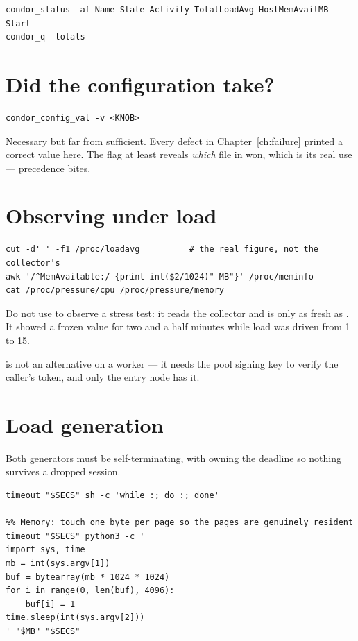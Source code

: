 \begin{lstlisting}[style=term]
condor_status -af Name State Activity TotalLoadAvg HostMemAvailMB Start
condor_q -totals
\end{lstlisting}

\section{Did the configuration take?}

\begin{lstlisting}[style=term]
condor_config_val -v <KNOB>
\end{lstlisting}

\begin{trap}
Necessary but far from sufficient. Every defect in Chapter~\ref{ch:failure}
printed a correct value here. The  flag at least reveals \emph{which} file
in  won, which is its real use --- precedence bites.
\end{trap}

\section{Observing under load}

\begin{lstlisting}[style=term]
cut -d' ' -f1 /proc/loadavg          # the real figure, not the collector's
awk '/^MemAvailable:/ {print int($2/1024)" MB"}' /proc/meminfo
cat /proc/pressure/cpu /proc/pressure/memory
\end{lstlisting}

\begin{trap}
Do not use  to observe a stress test: it reads the collector
and is only as fresh as . It showed a frozen value for two
and a half minutes while load was driven from 1 to 15.

 is not an alternative on a worker --- it needs the
pool signing key to verify the caller's token, and only the entry node has it.
\end{trap}

\section{Load generation}

Both generators must be self-terminating, with  owning the deadline
so nothing survives a dropped session.

\begin{lstlisting}[style=term]
%% CPU: tight loop, no fork per iteration
timeout "$SECS" sh -c 'while :; do :; done'

%% Memory: touch one byte per page so the pages are genuinely resident
timeout "$SECS" python3 -c '
import sys, time
mb = int(sys.argv[1])
buf = bytearray(mb * 1024 * 1024)
for i in range(0, len(buf), 4096):
    buf[i] = 1
time.sleep(int(sys.argv[2]))
' "$MB" "$SECS"
\end{lstlisting}

